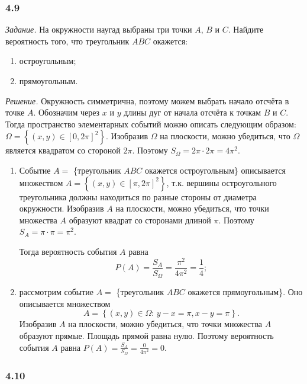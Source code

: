 \subsubsection*{4.9}

\textit{Задание.} На окружности наугад выбраны три точки $A, \, B$ и $C$.
Найдите вероятность того, что треугольник $ABC$ окажется:
\begin{enumerate}[label=\alph*)]
\item остроугольным;
\item прямоугольным.
\end{enumerate}

\textit{Решение.} Окружность симметрична, поэтому можем выбрать начало отсчёта в точке $A$.
Обозначим через $x$ и $y$ длины дуг от начала отсчёта к точкам $B$ и $C$.
Тогда пространство элементарных событий можно описать следующим образом:
$ \Omega =
\left\{ \left( x, y \right) \in \left[0, 2 \pi \right]^2 \right\}$.
Изобразив $ \Omega $ на плоскости, можно убедиться, что $ \Omega $ является квадратом со стороной $2 \pi$.
Поэтому $S_{ \Omega } = 2 \pi \cdot 2 \pi = 4 \pi^2$.

\begin{enumerate}[label=\alph*)]
\item Событие $A =$
\{треугольник $ABC$ окажется остроугольным\}
описывается множеством
$A =
\left\{ \left( x, y \right) \in \left[ \pi, 2 \pi \right]^2 \right\}$,
т.к. вершины остроугольного треугольника должны находиться по разные стороны от диаметра окружности.
Изобразив $A$ на плоскости, можно убедиться, что точки множества $A$ образуют квадрат со сторонами длиной $ \pi $.
Поэтому $S_A = \pi \cdot \pi = \pi^2$.

Тогда вероятность события $A$ равна
$$P \left( A \right) =
\frac{S_A}{S_{ \Omega }} =
\frac{ \pi^2}{4 \pi^2} =
\frac{1}{4};$$
\item рассмотрим событие $A =$ \{треугольник $ABC$ окажется прямоугольным\}.
Оно описывается множеством
$$A = \left\{ \left( x, y \right) \in \Omega: \, y - x = \pi, x - y = \pi \right\}.$$	
Изобразив $A$ на плоскости, можно убедиться, что точки множества $A$ образуют прямые.
Площадь прямой равна нулю.
Поэтому вероятность события $A$ равна
$P \left( A \right) =
\frac{S_A}{S_{ \Omega }} =
\frac{0}{4 \pi^2} =
0.$
\end{enumerate}

\subsubsection*{4.10}


